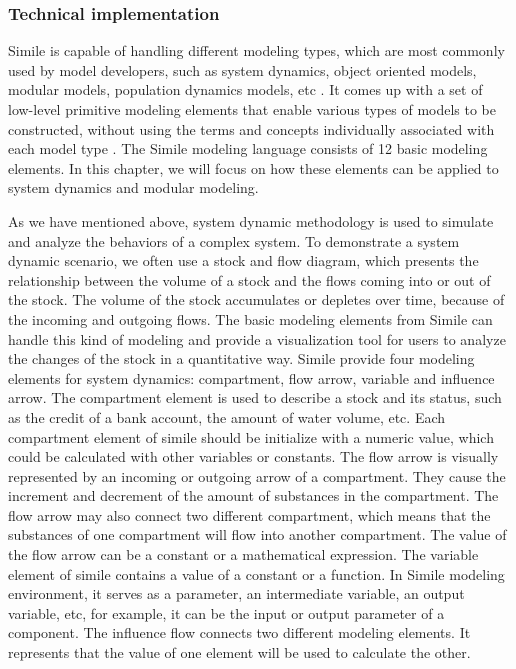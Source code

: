 \subsubsection{Technical implementation}
\par
Simile is capable of handling different modeling types, which are most commonly used by model developers, such as system dynamics, object oriented models, modular models, population dynamics models, etc \autocite{dsl:simile-simulistics}. It comes up with a set of low-level primitive modeling elements that enable various types of models to be constructed, without using the terms and concepts individually associated with each model type \autocite{dsl:simile-muetzelfeldt}. The Simile modeling language consists of 12 basic modeling elements. In this chapter, we will focus on how these elements can be applied to system dynamics and modular modeling.
\par
As we have mentioned above, system dynamic methodology is used to simulate and analyze the behaviors of a complex system. To demonstrate a system dynamic scenario, we often use a stock and flow diagram, which presents the relationship between the volume of a stock and the flows coming into or out of the stock. The volume of the stock accumulates or depletes over time, because of the incoming and outgoing flows. The basic modeling elements from Simile can handle this kind of modeling and provide a visualization tool for users to analyze the changes of the stock in a quantitative way. Simile provide four modeling elements for system dynamics: compartment, flow arrow, variable and influence arrow. The compartment element is used to describe a stock and its status, such as the credit of a bank account, the amount of water volume, etc. Each compartment element of simile should be initialize with a numeric value, which could be calculated with other variables or constants. The flow arrow is visually represented by an incoming or outgoing arrow of a compartment. They cause the increment and decrement of the amount of substances in the compartment. The flow arrow may also connect two different compartment, which means that the substances of one compartment will flow into another compartment. The value of the flow arrow can be a constant or a mathematical expression. The variable element of simile contains a value of a constant or a function. In Simile modeling environment, it serves as a parameter, an intermediate variable, an output variable, etc, for example, it can be the input or output parameter of a component. The influence flow connects two different modeling elements. It represents that the value of one element will be used to calculate the other.
